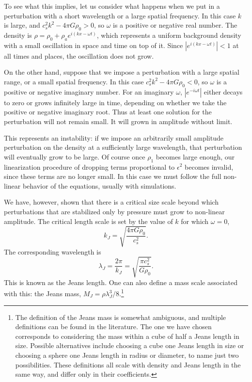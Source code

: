 To see what this implies, let us consider what happens when we put in a perturbation with a short wavelength or a large spatial frequency. In this case $k$ is large, and $c_s^2 k^2 - 4\pi G \rho_0>0$, so $\omega$ is a positive or negative real number. The density is $\rho=\rho_0 + \rho_a e^{i(kx-\omega t)}$, which represents a uniform background density with a small oscillation in space and time on top of it. Since $|e^{i(kx-\omega t)}| < 1$ at all times and places, the oscillation does not grow.

On the other hand, suppose that we impose a perturbation with a large spatial range, or a small spatial frequency. In this case $c_s^2 k^2 - 4\pi G \rho_0<0$, so $\omega$ is a positive or negative imaginary number. For an imaginary $\omega$, $|e^{-i\omega t}|$ either decays to zero or grows infinitely large in time, depending on whether we take the positive or negative imaginary root. Thus at least one solution for the perturbation will not remain small. It will grown in amplitude without limit.

This represents an instability: if we impose an arbitrarily small amplitude perturbation on the density at a sufficiently large wavelength, that perturbation will eventually grow to be large. Of course once $\rho_1$ becomes large enough, our linearization procedure of dropping terms proportional to $\epsilon^2$ becomes invalid, since these terms are no longer small. In this case we must follow the full non-linear behavior of the equations, usually with simulations.

We have, however, shown that there is a critical size scale beyond which perturbations that are stabilized only by pressure must grow to non-linear amplitude. The critical length scale is set by the value of $k$ for which $\omega=0$,
\begin{equation}
k_J = \sqrt{\frac{4\pi G\rho_0}{c_s^2}}.
\end{equation}
The corresponding wavelength is
\begin{equation}
\lambda_J = \frac{2\pi}{k_J} = \sqrt{\frac{\pi c_s^2}{G\rho_0}}.
\end{equation}
This is known as the Jeans length. One can also define a mass scale associated with this: the Jeans mass, $M_J=\rho\lambda_J^3/8$.\footnote{The definition of the Jeans mass is somewhat ambiguous, and multiple definitions can be found in the literature. The one we have chosen corresponds to considering the mass within a cube of half a Jeans length in size. Possible alternatives include choosing a cube one Jeans length in size or choosing a sphere one Jeans length in radius or diameter, to name just two possibilities. These definitions all scale with density and Jeans length in the same way, and differ only in their coefficients.}

